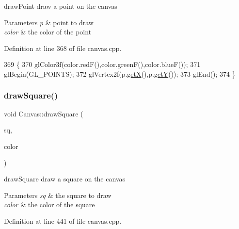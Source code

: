 draw\+Point draw a point on the canvas 


\begin{DoxyParams}{Parameters}
{\em p} & point to draw \\
\hline
{\em color} & the color of the point \\
\hline
\end{DoxyParams}


Definition at line 368 of file canvas.\+cpp.


\begin{DoxyCode}
369 \{
370     glColor3f(color.redF(),color.greenF(),color.blueF());
371     glBegin(GL\_POINTS);
372     glVertex2f(p.\hyperlink{class_point_a29c44ec7c7279e02629645a06cdaf7d5}{getX}(),p.\hyperlink{class_point_a2371ffadbe245d12a8f556d0a976521b}{getY}());
373     glEnd();
374 \}
\end{DoxyCode}
\mbox{\label{class_canvas_a78ce810ea0004c4f3fa9ee9d92996875}} 
\subsubsection{\texorpdfstring{draw\+Square()}{drawSquare()}}
{\footnotesize\ttfamily void Canvas\+::draw\+Square (\begin{DoxyParamCaption}\item[{\hyperlink{class_a_a_b_b}{A\+A\+BB}}]{sq,  }\item[{Q\+Color}]{color }\end{DoxyParamCaption})\hspace{0.3cm}{\ttfamily [private]}}



draw\+Square draw a square on the canvas 


\begin{DoxyParams}{Parameters}
{\em sq} & the square to draw \\
\hline
{\em color} & the color of the square \\
\hline
\end{DoxyParams}


Definition at line 441 of file canvas.\+cpp.



